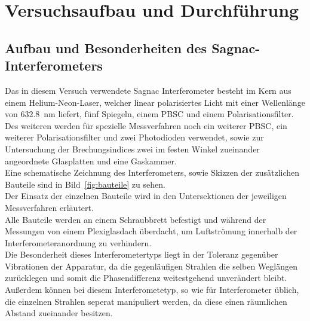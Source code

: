 
\section{Versuchsaufbau und Durchführung}

\subsection{Aufbau und Besonderheiten des Sagnac-Interferometers}
%
Das in diesem Versuch verwendete Sagnac Interferometer besteht im 
Kern aus einem Helium-Neon-Laser, welcher linear polarisiertes 
Licht mit einer Wellenlänge von \SI{632.8}{\nano\metre} liefert, 
fünf Spiegeln, einem PBSC und einem Polarisationsfilter.\\
Des weiteren werden für spezielle Messverfahren noch ein weiterer 
PBSC, ein weiterer Polarisationsfilter und zwei Photodioden 
verwendet, sowie zur Untersuchung der Brechungsindices zwei im 
festen Winkel zueinander angeordnete Glasplatten und eine Gaskammer.\\
Eine schematische Zeichnung des Interferometers, sowie Skizzen der 
zusätzlichen Bauteile sind in Bild~\ref{fig:bauteile} zu sehen.\\
Der Einsatz der einzelnen Bauteile wird in den Untersektionen 
der jeweiligen Messverfahren erläutert.\\
Alle Bauteile werden an einem Schraubbrett befestigt und während 
der Messungen von einem Plexiglasdach überdacht, um Luftströmung 
innerhalb der Interferometeranordnung zu verhindern.\\
Die Besonderheit dieses Interferometertyps liegt in der 
Toleranz gegenüber Vibrationen der Apparatur, da die gegenläufigen 
Strahlen die selben Weglängen zurücklegen und somit die 
Phasendifferenz weitestgehend unverändert bleibt. Außerdem können  
bei diesem Interferometetyp, so wie für Interferometer üblich, die 
einzelnen Strahlen seperat manipuliert werden, da diese einen 
räumlichen Abstand zueinander besitzen.\\
%
